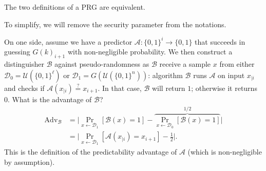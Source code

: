\documentclass[./main]{subfiles}
\begin{document}
  \begin{thm}
    The two definitions of a PRG are equivalent.
  \end{thm}
  \begin{prv}
    To simplify, we will remove the security parameter from the notations.

    On one side, assume we have a predictor $\mathcal{A} : \{0,1\}^i \to \{0,1\}$ that succeeds in guessing $G(k)_{i+1}$ with non-negligible probability.
    We then construct a distinguisher $\mathcal{B}$ against pseudo-randomness as $\mathcal{B}$ receive a sample $x$ from either $\mathcal{D}_0 = \mathcal{U}(\{0,1\}^\ell)$ or $\mathcal{D}_1 = G(\mathcal{U}(\{0,1\}^n))$:
    algorithm $\mathcal{B}$ runs $\mathcal{A}$ on input  $x_{|i}$ and checks if $\mathcal{A}(x_{|i}) \overset ? = x_{i+1}$.
    In that case, $\mathcal{B}$ will return $1$; otherwise it returns $0$.
    What is the advantage of $\mathcal{B}$?
    \begin{align*}
      \mathrm{Adv}_{\mathcal{B}} &=
      \big| \Pr_{x \gets \mathcal{D}_1}[\mathcal{B}(x) = 1] - \overbrace{\Pr_{x \gets \mathcal{D}_0}[\mathcal{B}(x) = 1]}^{1 / 2} \big| \\
      &= \big| \Pr_{x \gets \mathcal{D}_1}[\mathcal{A}(x_{|i}) = x_{i+1}] - \frac{1}{2} \big|
    .\end{align*}
    This is the definition of the predictability advantage of $\mathcal{A}$ (which is non-negligible by assumption).


\end{prv}
\end{document}

